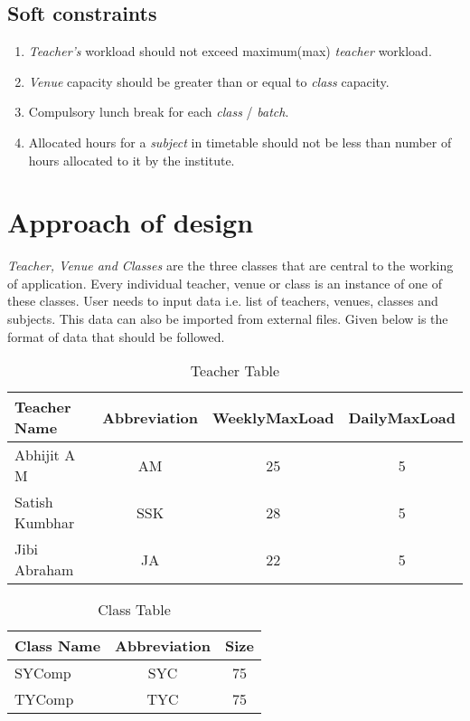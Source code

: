 \subsection{Soft constraints}
\begin{enumerate}
\item \textit{Teacher's} workload should not exceed maximum(max) \textit{teacher} workload.
\item \textit{Venue} capacity should be greater than or equal to \textit{class} capacity.
\item Compulsory lunch break for each \textit{class} / \textit{batch}.
\item Allocated hours for a \textit{subject} in timetable should not be less than number of hours allocated to it by the institute. 
\end{enumerate}

\newpage
\section{Approach of design}
\textit{Teacher, Venue and Classes} are the three classes that are central to the working of application. Every individual teacher, venue or class is an instance of one of these classes. User needs to input data i.e. list of teachers, venues, classes and subjects. This data can also be imported from external files. Given below is the format of data that should be followed.


\begin{table}[h!]
\centering
\begin{tabular}{|l|c|c|c|}

\hline
Teacher Name & Abbreviation & WeeklyMaxLoad & DailyMaxLoad\\
\hline
Abhijit A M & AM & 25 & 5\\
\hline
Satish Kumbhar & SSK & 28 & 5\\
\hline
Jibi Abraham & JA & 22 & 5\\
\hline
\end{tabular}
\caption{Teacher Table}
\label{tab:template}
\end{table}

\begin{table}[h!]
\centering
\begin{tabular}{|l|c|c|}

\hline
 Class Name & Abbreviation & Size\\
\hline
SYComp & SYC & 75\\
\hline
TYComp & TYC & 75\\
\hline 
\end{tabular}
\caption{Class Table}
\label{tab:template}
\end{table}

